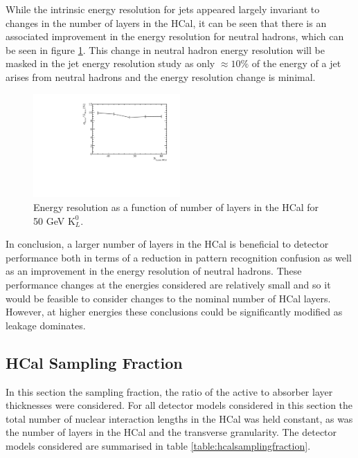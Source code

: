 While the intrinsic energy resolution for jets appeared largely invariant to changes in the number of layers in the HCal, it can be seen that there is an associated improvement in the energy resolution for neutral hadrons, which can be seen in figure \ref{fig:hcalnfixedlayerser}.  This change in neutral hadron energy resolution will be masked in the jet energy resolution study as only $\approx 10\%$ of the energy of a jet arises from neutral hadrons and the energy resolution change is minimal.   

\begin{figure}
\centering
\includegraphics[width=0.5\textwidth]{OptimisationStudies/Plots/EnergyResolution/ER_vs_HCalNFixedLayers_50GeVKaon0L.pdf}
\caption[Energy resolution as a function of number of layers in the HCal for 50 GeV $\text{K}^{0}_{L}$.]{Energy resolution as a function of number of layers in the HCal  for 50 GeV $\text{K}^{0}_{L}$.}
\label{fig:hcalnfixedlayerser}
\end{figure}

In conclusion, a larger number of layers in the HCal is beneficial to detector performance both in terms of a reduction in pattern recognition confusion as well as an improvement in the energy resolution of neutral hadrons.  These performance changes at the energies considered are relatively small and so it would be feasible to consider changes to the nominal number of HCal layers.  However, at higher energies these conclusions could be significantly modified as leakage dominates.  


\subsection{HCal Sampling Fraction}
\label{sec:hcalsamplingfraction}
In this section the sampling fraction, the ratio of the active to absorber layer thicknesses were considered.  For all detector models considered in this section the total number of nuclear interaction lengths in the HCal was held constant, as was the number of layers in the HCal and the transverse granularity.  The detector models considered are summarised in table \ref{table:hcalsamplingfraction}. 

